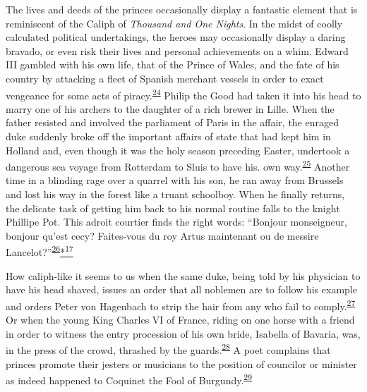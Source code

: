 The lives and deeds of the princes occasionally display a fantastic
element that is reminiscent of the Caliph of \emph{Thousand and One
Nights}. In the midst of coolly calculated political undertakings, the
heroes may occasionally display a daring bravado, or even risk their
lives and personal achievements on a whim. Edward III gambled with his
own life, that of the Prince of Wales, and the fate of his country by
attacking a fleet of Spanish merchant vessels in order to exact
vengeance for some acts of
piracy.\textsuperscript{\protect\hypertarget{08_Chapter_One__THE_PASSIONATE_INTE.xhtmlux5cux23id_2183}{\protect\hyperlink{23_NOTES.xhtmlux5cux23id_2184}{24}}}
Philip the Good had taken it into his head to marry one of his archers
to the daughter of a rich brewer in Lille. When the father resisted and
involved the parliament of Paris in the affair, the enraged duke
suddenly broke off the important affairs of state that had kept him in
Holland and, even though it was the holy season preceding Easter,
undertook a dangerous sea voyage from Rotterdam to Sluis to have his.
own
way.\textsuperscript{\protect\hypertarget{08_Chapter_One__THE_PASSIONATE_INTE.xhtmlux5cux23id_2181}{\protect\hyperlink{23_NOTES.xhtmlux5cux23id_2182}{25}}}
Another time in a blinding rage over a quarrel with his son, he ran away
from Brussels and lost his way in the forest like a truant schoolboy.
When he finally returns, the delicate task of getting him back to his
normal routine falls to the knight Phillipe Pot. This adroit courtier
finds the right words: ``Bonjour monseigneur, bonjour qu'est cecy?
Faites-vous du roy Artus maintenant ou de messire
Lancelot?''\textsuperscript{\protect\hypertarget{08_Chapter_One__THE_PASSIONATE_INTE.xhtmlux5cux23id_2179}{\protect\hyperlink{23_NOTES.xhtmlux5cux23id_2180}{26}}}\protect\hypertarget{08_Chapter_One__THE_PASSIONATE_INTE.xhtmlux5cux23id_2279}{\protect\hyperlink{23_NOTES.xhtmlux5cux23id_2278}{*\textsuperscript{17}}}

How caliph-like it seems to us when the same duke, being told by his
physician to have his head shaved, issues an order that all noblemen are
to follow his example and orders Peter von Hagenbach to strip the hair
from any who fail to
comply.\textsuperscript{\protect\hypertarget{08_Chapter_One__THE_PASSIONATE_INTE.xhtmlux5cux23id_2177}{\protect\hyperlink{23_NOTES.xhtmlux5cux23id_2178}{27}}}
Or when the young King Charles VI of France, riding on one horse with a
friend in order to witness the entry procession of his own bride,
Isabella of Bavaria, was, in the press of the crowd, thrashed by the
guards.\textsuperscript{\protect\hypertarget{08_Chapter_One__THE_PASSIONATE_INTE.xhtmlux5cux23id_2175}{\protect\hyperlink{23_NOTES.xhtmlux5cux23id_2176}{28}}}
\protect\hypertarget{08_Chapter_One__THE_PASSIONATE_INTE.xhtmlux5cux23page_12}{}{}A
poet complains that princes promote their jesters or musicians to the
position of councilor or minister as indeed happened to Coquinet the
Fool of
Burgundy.\textsuperscript{\protect\hypertarget{08_Chapter_One__THE_PASSIONATE_INTE.xhtmlux5cux23id_2173}{\protect\hyperlink{23_NOTES.xhtmlux5cux23id_2174}{29}}}

